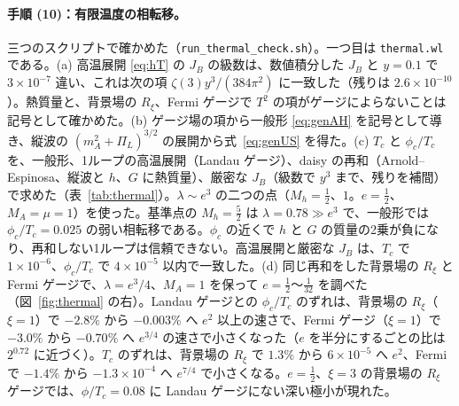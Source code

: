 \documentclass[a4paper,10pt]{ltjsarticle}
\begin{document}
\paragraph{手順 (10)：有限温度の相転移。}三つのスクリプトで確かめた（\texttt{run\_thermal\_check.sh}）。一つ目は \texttt{thermal.wl} である。(a) 高温展開 \eqref{eq:hT} の $J_B$ の級数は、数値積分した $J_B$ と $y=0.1$ で $3\times10^{-7}$ 違い、これは次の項 $\zeta(3)y^3/(384\pi^2)$ に一致した（残りは $2.6\times10^{-10}$）。熱質量と、背景場の $R_\xi$、Fermi ゲージで $T^2$ の項がゲージによらないことは記号として確かめた。(b) ゲージ場の項から一般形 \eqref{eq:genAH} を記号として導き、縦波の $(m_A^2+\Pi_L)^{3/2}$ の展開から式~\eqref{eq:genUS} を得た。(c) $T_c$ と $\phi_c/T_c$ を、一般形、1ループの高温展開（Landau ゲージ）、daisy の再和（Arnold--Espinosa、縦波と $h$、$G$ に熱質量）、厳密な $J_B$（級数で $y^3$ まで、残りを補間）で求めた（表~\ref{tab:thermal}）。$\lambda\sim e^3$ の二つの点（$M_h=\frac12$、$1$。$e=\frac12$、$M_A=\mu=1$）を使った。基準点の $M_h=\frac52$ は $\lambda=0.78\gg e^3$ で、一般形では $\phi_c/T_c=0.025$ の弱い相転移である。$\phi_c$ の近くで $h$ と $G$ の質量の2乗が負になり、再和しない1ループは信頼できない。高温展開と厳密な $J_B$ は、$T_c$ で $1\times10^{-6}$、$\phi_c/T_c$ で $4\times10^{-5}$ 以内で一致した。(d) 同じ再和をした背景場の $R_\xi$ と Fermi ゲージで、$\lambda=e^3/4$、$M_A=1$ を保って $e=\frac12$〜$\frac1{32}$ を調べた（図~\ref{fig:thermal} の右）。Landau ゲージとの $\phi_c/T_c$ のずれは、背景場の $R_\xi$（$\xi=1$）で $-2.8\%$ から $-0.003\%$ へ $e^2$ 以上の速さで、Fermi ゲージ（$\xi=1$）で $-3.0\%$ から $-0.70\%$ へ $e^{3/4}$ の速さで小さくなった（$e$ を半分にするごとの比は $2^{0.72}$ に近づく）。$T_c$ のずれは、背景場の $R_\xi$ で $1.3\%$ から $6\times10^{-5}$ へ $e^2$、Fermi で $-1.4\%$ から $-1.3\times10^{-4}$ へ $e^{7/4}$ で小さくなる。$e=\frac12$、$\xi=3$ の背景場の $R_\xi$ ゲージでは、$\phi/T_c=0.08$ に Landau ゲージにない深い極小が現れた。
\end{document}
